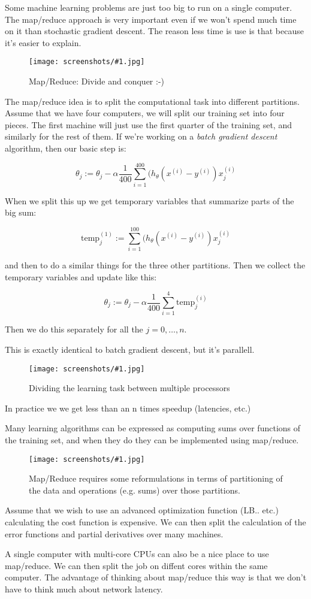 \documentclass[a4, 12pt, english, USenglish]{scrreprt}
\newcommand{\screenshot}[2]{
\begin{figure}[htb]
\texttt{[image: screenshots/\#1.jpg]}
\label{#1}
\caption{#2}
\end{figure}}
\newcommand{\idx}[1]{{\em #1}\index{#1}}
\begin{document}
Some machine learning problems are just too big to run on a single
computer.    The map/reduce approach is very important even if we
won't spend much time on it than stochastic gradient descent.  The
reason less time is use is that because it's easier to explain.

\screenshot{mapreduce}{Map/Reduce: Divide and conquer :-)}

The map/reduce idea is to split the computational task into different
partitions.   Assume that we have four computers, we will split our
training set into four pieces.     The first machine will just use the
first quarter of the training set, and similarly for the rest of
them.     If we're working on a \idx{batch gradient descent}
algorithm, then our basic step is:

\[
    \theta_j := \theta_j - \alpha \frac{1}{400} \sum_{i=1}^{400} (h_\theta(x^{(i)} - y^{(i)}) x_j^{(i)}
\]

When we split this up we get temporary variables that summarize parts
of the big sum:

\[
    \mbox{temp}_j^{(1)} := \sum_{i=1}^{100} (h_\theta(x^{(i)} - y^{(i)}) x_j^{(i)}
\]

and then to do a similar things for the three other partitions.  Then
we collect the temporary variables and update like this:

\[
  \theta_j := \theta_j - \alpha\frac{1}{400} \sum_{i=1}^4 \mbox{temp}_j^{(i)}
\]

Then we do this separately for all the \(j=0, \ldots, n\).

This is exactly identical to batch gradient descent, but it's
parallell.

\screenshot{mapreduce2}{Dividing the learning task between multiple processors}

In practice we we get less than an n times speedup (latencies, etc.)

Many learning algorithms can be expressed as computing sums over
functions of the training set, and when they do they can be
implemented using map/reduce.
\screenshot{advancedmapreduce}{Map/Reduce requires some reformulations
in terms of partitioning of the data and operations (e.g. sums) over
those partitions.}

Assume that we wish to use an advanced optimization function
(LB.. etc.) calculating the cost function is expensive.  We can then
split the calculation of the error functions and partial derivatives
over many machines.

A single computer with multi-core CPUs can also be a nice place to use
map/reduce.  We can then split the job on diffent cores within the
same computer.  The advantage of thinking about map/reduce this way is
that we don't have to think much about network latency.
\end{document}
